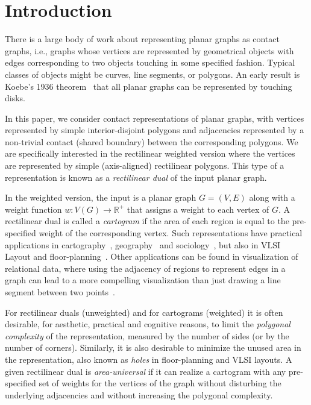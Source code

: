 \documentclass[11pt]{article}
\begin{document}
\newpage

\section{Introduction}
\label{sec:intro}

There is a large body of work about representing planar graphs as
contact graphs, i.e., graphs whose vertices are represented by
geometrical objects with edges corresponding to two objects touching
in some specified fashion. Typical classes of objects might be curves,
line segments,  or polygons. An early result is Koebe's 1936 theorem~\cite{Koebe36} that all planar graphs can be represented by
 touching disks.

In this paper, we consider contact representations of planar graphs, with vertices represented by simple interior-disjoint polygons
 and adjacencies represented by a non-trivial contact (shared boundary)
between the
 corresponding polygons. We are specifically interested in the
 rectilinear weighted version where the vertices are represented by
 simple (axis-aligned) rectilinear polygons.
This type of a representation is known
 as a {\em rectilinear dual} of the input planar graph.

 In the weighted version, the input is a planar graph $G=(V,E)$ along with a weight function $w:V(G)\rightarrow \mathbb{R}^+$ that
 assigns a weight to each vertex of $G$. A rectilinear dual is called a \textit{cartogram} if the area
 of each region is equal to the pre-specified weight of the
 corresponding vertex.  Such representations have practical applications in
 cartography~\cite{r-rsc-34}, geography~\cite{Tobler04thirtyfive} and sociology~\cite{HK98}, but also in VLSI Layout and
 floor-planning~\cite{MCP2002}.
Other applications can be found in visualization of relational data,
where using the adjacency of regions to represent edges in a graph can lead
 to a more compelling visualization than just drawing a line segment
 between two points~\cite{Buchsbaum08}.


 For rectilinear duals (unweighted) and for cartograms (weighted) it
 is often desirable, for aesthetic, practical and cognitive reasons,
 to limit the {\em polygonal complexity} of the representation,
 measured by the number of sides (or by the number of corners).
 Similarly, it is also desirable to minimize the unused area in the
 representation, also known as {\em holes} in floor-planning and VLSI
 layouts. A given rectilinear dual is {\em area-universal} if it can
 realize a cartogram with any pre-specified set of weights for the
 vertices of the graph without disturbing the underlying adjacencies
 and without increasing the polygonal complexity.
\end{document}
